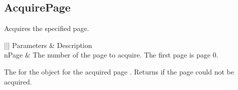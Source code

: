 \documentclass[letterpaper,12pt,english,openany,oneside]{sphinxmanual}
\begin{document}
\subsection{AcquirePage}
\label{\detokenize{IAC_API_OLE_Objects:acquirepage}}
Acquires the specified page.


\begin{sphinxVerbatim}[commandchars=\\\{\}]
  
\end{sphinxVerbatim}
\label{\detokenize{IAC_API_OLE_Objects:parameters-50}}


\begin{savenotes}\sphinxattablestart
\centering
{}\label{\detokenize{IAC_API_OLE_Objects:section-57}}\nobreak
\begin{tabular}[t]{|||}
\hline
\sphinxstyletheadfamily 
Parameters
&\sphinxstyletheadfamily 
Description
\\
\hline
nPage
&
The number of the page to acquire. The first page is page 0.
\\
\hline
\end{tabular}
\par
\sphinxattableend\end{savenotes}


The  for the  object for the acquired page . Returns  if the page could not be acquired.
\end{document}
